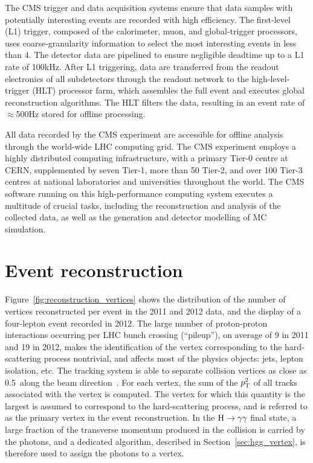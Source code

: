 \documentclass[11pt,twoside,a4paper,cmspaper,final,collab]{cms-tdr}
\begin{document}
The CMS trigger and data acquisition systems ensure that data samples with potentially
interesting events are recorded with high efficiency. The first-level (L1)
trigger, composed of the calorimeter, muon, and global-trigger
processors, uses
coarse-granularity information to select the most interesting events in less than 4\mus. The
detector data are pipelined to ensure negligible deadtime up to a L1
rate of 100\unit{kHz}.
After L1 triggering, data are transferred from the readout electronics of all subdetectors
through the readout network to the high-level-trigger (HLT) processor farm, which
assembles the full event and executes global reconstruction algorithms.  The HLT filters the data, resulting
in an event rate of $\approx$500\unit{Hz} stored for offline processing.

All data recorded by the CMS experiment are accessible for offline analysis
through the world-wide LHC computing grid.
The CMS experiment employs a highly distributed computing infrastructure, with a
primary Tier-0 centre at CERN, supplemented by seven Tier-1, more than 50 Tier-2, and over 100
Tier-3 centres at national laboratories and universities throughout
the world.
The CMS software running on this high-perfor\-mance
computing system executes a multitude of crucial tasks, including the reconstruction
and analysis of the collected data, as well as the generation and
detector modelling of MC simulation.

\section{Event reconstruction}\label{sec:reconstruction}
Figure~\ref{fig:reconstruction_vertices} shows the distribution
of the number of vertices reconstructed per event in the 2011 and 2012 data, and the display of a four-lepton event recorded in 2012.
The large number of proton-proton interactions occurring per LHC bunch crossing  (``pileup''),
on average of 9 in 2011 and 19 in 2012,
makes the identification of the vertex corresponding to the hard-scattering process nontrivial,
and affects most of the physics objects: jets, lepton isolation, etc.
The tracking system is able to separate collision vertices as close as 0.5~\mm along the beam direction~\cite{IEEE_DetAnnealing}.
For each vertex, the sum of the $p_{\mathrm{T}}^2$ of all tracks associated with the vertex
is computed. The vertex for which this quantity is the largest is assumed to correspond to the hard-scattering
process, and is referred to as the primary vertex in the event reconstruction.
In the $\mathrm{H}\to\gamma\gamma$ final state, a large fraction of the transverse momentum produced in the collision is carried by the photons,
 and a dedicated algorithm,
described in Section~\ref{sec:hgg_vertex}, is therefore used to assign the photons to a vertex.
\end{document}

